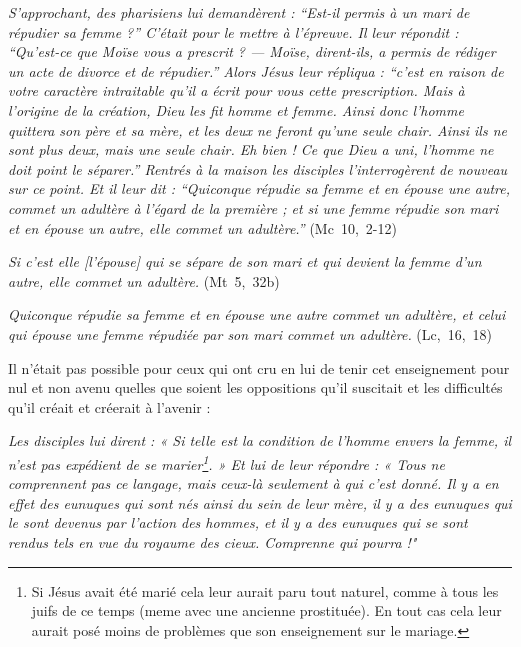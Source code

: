 \begin{displayquote}
\emph{S'approchant, des pharisiens lui demandèrent : \enquote{Est-il permis à un mari de répudier sa femme ?} C'était pour le mettre à l'épreuve. Il leur répondit : \enquote{Qu'est-ce que Moïse vous a prescrit ? --- Moïse, dirent-ils, a permis de rédiger un acte de divorce et de répudier.} Alors Jésus leur répliqua : \enquote{c'est en raison de votre caractère intraitable qu'il a écrit pour vous cette prescription. Mais à l'origine de la création, Dieu les fit homme et femme. Ainsi donc l'homme quittera son père et sa mère, et les deux ne feront qu'une seule chair. Ainsi ils ne sont plus deux, mais une seule chair. Eh bien ! Ce que Dieu a uni, l'homme ne doit point le séparer.} Rentrés à la maison les disciples l'interrogèrent de nouveau sur ce point. Et il leur dit : \enquote{Quiconque répudie sa femme et en épouse une autre, commet un adultère à l'égard de la première ; et si une femme répudie son mari et en épouse un autre, elle commet un adultère.}} (Mc~10,~2-12)

{\emph{Si c'est elle \emph{[l'épouse]} qui se sépare de son mari et qui devient la femme d'un autre, elle commet un adultère.}} (Mt~5,~32b)

{\emph{Quiconque répudie sa femme et en épouse une autre commet un adultère, et celui qui épouse une femme répudiée par son mari commet un adultère.}} (Lc,~16,~18)
 \end{displayquote} 

  Il n'était pas possible pour ceux qui ont cru en lui de tenir cet enseignement pour nul et non avenu quelles que soient les oppositions qu'il suscitait et les difficultés qu'il créait et créerait à l'avenir :

\begin{displayquote}[Mt~19,~10-12]
\emph{Les disciples lui dirent : « Si telle est la condition de l'homme envers la femme, il n'est pas expédient de se marier\footnote{Si Jésus avait été marié  cela leur aurait paru tout naturel, comme à tous les juifs de ce temps (meme avec une ancienne prostituée). En tout cas cela leur aurait posé moins de problèmes que son enseignement sur le mariage.}. » Et lui de leur répondre : « Tous ne comprennent pas ce langage, mais ceux-là seulement à qui c'est donné. Il y a en effet des eunuques qui sont nés ainsi du sein de leur mère, il y a des eunuques qui le sont devenus par l'action des hommes, et il y a des eunuques qui se sont rendus tels en vue du royaume des cieux. Comprenne qui pourra !"}
\end{displayquote}
 
